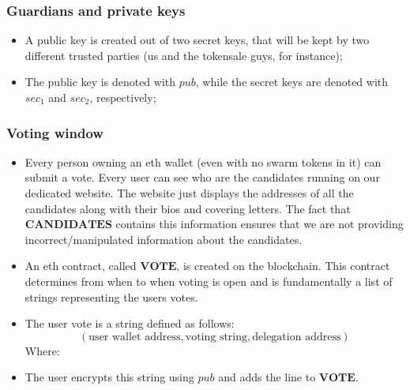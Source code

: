 \documentclass[submission, copyright,creativecommons,sharealike,noncommercial]{eptcs}
\begin{document}
		\subsubsection{Guardians and private keys}
			\begin{itemize}
				\item A public key is created out of two secret keys, that will be kept by two different trusted parties (us and the tokensale guys, for instance);
				
				\item The public key is denoted with $pub$, while the secret keys are denoted with $sec_1$ and $sec_2$, respectively;
				
			\end{itemize}
		\subsubsection{Voting window}
			\begin{itemize}
				\item Every person owning an eth wallet (even with no swarm tokens in it) can submit a vote. Every user can see who are the candidates running on our dedicated website. The website just displays the addresses of all the candidates along with their bios and covering letters. The fact that $\textbf{CANDIDATES}$ contains this information ensures that we are not providing incorrect/manipulated information about the candidates.
				
				\item An eth contract, called $\textbf{VOTE}$, is created on the blockchain. This contract determines from when to when voting is open and is fundamentally a list of strings representing the users votes.
				
				\item The user vote is a string defined as follows: 
				\[
				(\text{user wallet address}, \text{voting string}, \text{delegation address})
				\]
				Where:
			
				\item The user encrypts this string using $pub$ and adds the line to $\textbf{VOTE}$.
			\end{itemize}
		
\end{document}

